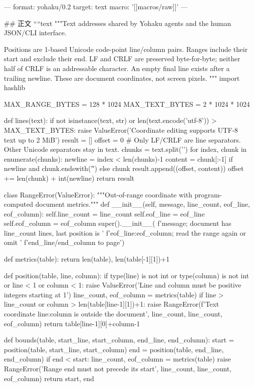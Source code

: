 ---
format: yohaku/0.2
target: text
macro: '[[macros/raw]]'
---

## 正文
````text
"""Text addresses shared by Yohaku agents and the human JSON/CLI interface.

Positions are 1-based Unicode code-point line/column pairs. Ranges include
their start and exclude their end. LF and CRLF are preserved byte-for-byte;
neither half of CRLF is an addressable character. An empty final line exists
after a trailing newline. These are document coordinates, not screen pixels.
"""
import hashlib

MAX_RANGE_BYTES = 128 * 1024
MAX_TEXT_BYTES = 2 * 1024 * 1024


def lines(text):
    if not isinstance(text, str) or len(text.encode('utf-8')) > MAX_TEXT_BYTES:
        raise ValueError('Coordinate editing supports UTF-8 text up to 2 MiB')
    result = []
    offset = 0
    # Only LF/CRLF are line separators. Other Unicode separators stay in text.
    chunks = text.split('\n')
    for index, chunk in enumerate(chunks):
        newline = index < len(chunks)-1
        content = chunk[:-1] if newline and chunk.endswith('\r') else chunk
        result.append((offset, content))
        offset += len(chunk) + int(newline)
    return result


class RangeError(ValueError):
    """Out-of-range coordinate with program-computed document metrics."""
    def __init__(self, message, line_count, eof_line, eof_column):
        self.line_count = line_count
        self.eof_line = eof_line
        self.eof_column = eof_column
        super().__init__(
            f'{message}; document has {line_count} lines, last position is '
            f'{eof_line}:{eof_column}; read the range again or omit '
            f'end_line/end_column to page')


def metrics(table):
    return len(table), len(table[-1][1])+1


def position(table, line, column):
    if type(line) is not int or type(column) is not int or line < 1 or column < 1:
        raise ValueError('Line and column must be positive integers starting at 1')
    line_count, eof_column = metrics(table)
    if line > line_count or column > len(table[line-1][1])+1:
        raise RangeError(f'Text coordinate {line}:{column} is outside the document',
                         line_count, line_count, eof_column)
    return table[line-1][0]+column-1


def bounds(table, start_line, start_column, end_line, end_column):
    start = position(table, start_line, start_column)
    end = position(table, end_line, end_column)
    if end < start:
        line_count, eof_column = metrics(table)
        raise RangeError('Range end must not precede its start',
                         line_count, line_count, eof_column)
    return start, end


